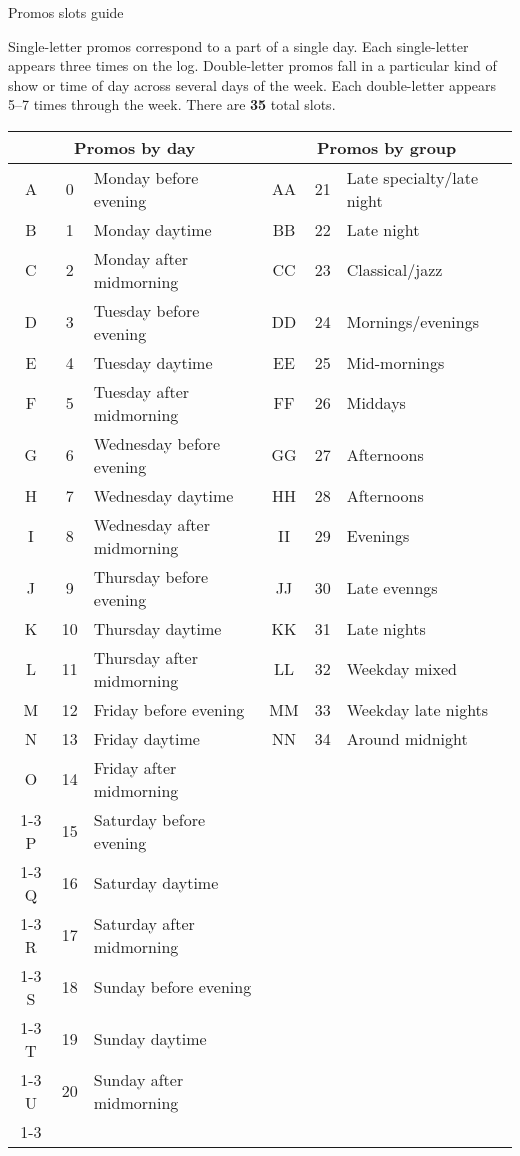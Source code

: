 \documentclass{article}
\begin{document}
\begin{center}
\Large Promos slots guide
\end{center}

Single-letter promos correspond to a part of a single day.  Each
single-letter appears three times on the log.  Double-letter promos
fall in a particular kind of show or time of day across several days
of the week.  Each double-letter appears 5--7 times through the week.
There are \textbf{35} total slots.

\begin{center}
\def\bothl#1#2#3#4#5{#1 & #2 & #3 & #1#1 & #4 & #5 \\ \hline}
\def\dayl#1#2#3{#1 & #2 & #3 \\ \cline{1-3}}
\begin{tabular}{|cc|l||cc|l|}
\hline \multicolumn{3}{|c||}{Promos by day} & \multicolumn{3}{c|}{Promos by group} \\ \hline\hline
\bothl A{0}{Monday before evening}{21}{Late specialty/late night}
\bothl B{1}{Monday daytime}{22}{Late night}
\bothl C{2}{Monday after midmorning}{23}{Classical/jazz}
\bothl D{3}{Tuesday before evening}{24}{Mornings/evenings}
\bothl E{4}{Tuesday daytime}{25}{Mid-mornings}
\bothl F{5}{Tuesday after midmorning}{26}{Middays}
\bothl G{6}{Wednesday before evening}{27}{Afternoons}
\bothl H{7}{Wednesday daytime}{28}{Afternoons}
\bothl I{8}{Wednesday after midmorning}{29}{Evenings}
\bothl J{9}{Thursday before evening}{30}{Late evenngs}
\bothl K{10}{Thursday daytime}{31}{Late nights}
\bothl L{11}{Thursday after midmorning}{32}{Weekday mixed}
\bothl M{12}{Friday before evening}{33}{Weekday late nights}
\bothl N{13}{Friday daytime}{34}{Around midnight}
\dayl  O{14}{Friday after midmorning}
\dayl  P{15}{Saturday before evening}
\dayl  Q{16}{Saturday daytime}
\dayl  R{17}{Saturday after midmorning}
\dayl  S{18}{Sunday before evening}
\dayl  T{19}{Sunday daytime}
\dayl  U{20}{Sunday after midmorning}
\end{tabular}
\end{center}
\end{document}
